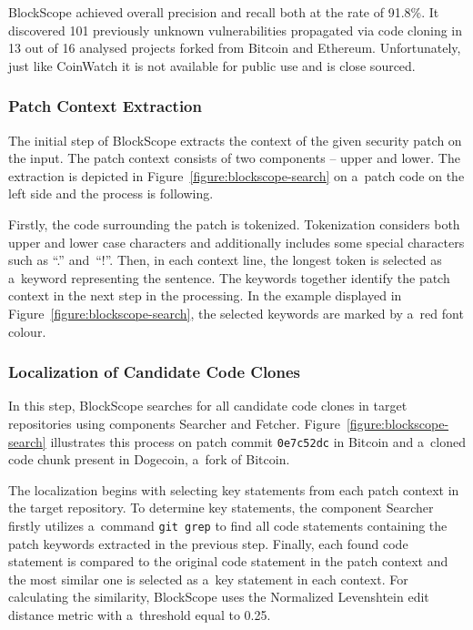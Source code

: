     BlockScope achieved overall precision and recall both at the rate of 91.8\%. It discovered 101 previously
    unknown vulnerabilities propagated via code cloning in 13 out of 16 analysed projects forked from Bitcoin
    and Ethereum. Unfortunately, just like CoinWatch it is not available for public use and is
    close sourced.

    \subsubsection*{Patch Context Extraction}
    The initial step of BlockScope extracts the context of the given security patch on the input. The patch context
    consists of two components -- upper and lower. The extraction is depicted in Figure~\ref{figure:blockscope-search}
    on a~patch code on the left side and the process is following.

    Firstly, the code surrounding the patch is tokenized. Tokenization considers both upper and lower case characters
    and additionally includes some special characters such as ``.'' and~``!''. Then, in each context line, the longest
    token is selected as a~keyword representing the sentence. The keywords together identify the patch context in the next
    step in the processing. In the example displayed in Figure~\ref{figure:blockscope-search}, the selected keywords
    are marked by a~red font colour.

    \subsubsection*{Localization of Candidate Code Clones}
    In this step, BlockScope searches for all candidate code clones in target repositories using components Searcher and Fetcher.
    Figure~\ref{figure:blockscope-search} illustrates this process on patch commit \texttt{0e7c52dc} in Bitcoin
    and a~cloned code chunk present in Dogecoin, a~fork of Bitcoin.

    The localization begins with selecting key statements from each patch context in the target repository.
    To determine key statements, the component Searcher firstly utilizes a~command \texttt{git grep} to find
    all code statements containing the patch keywords extracted in the previous step. Finally,
    each found code statement is compared to the original code statement in the patch context and the most similar
    one is selected as a~key statement in each context.
    For calculating the similarity, BlockScope uses the Normalized Levenshtein edit distance metric with a~threshold
    equal to 0.25.

